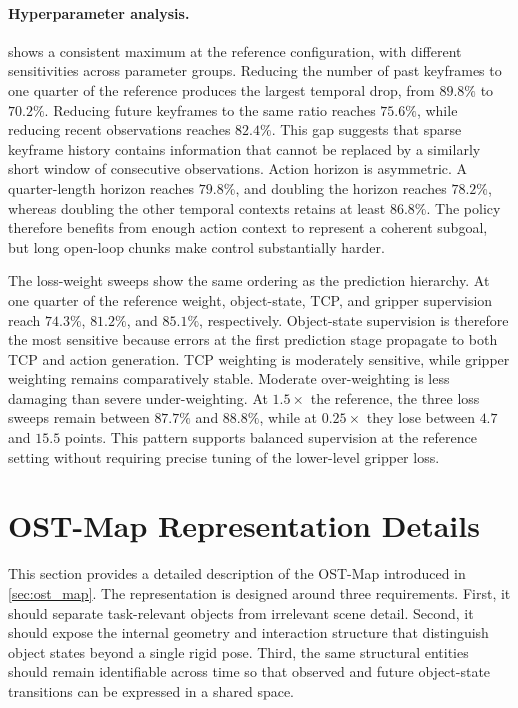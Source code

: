 \paragraph{Hyperparameter analysis.}
 shows a consistent maximum at the
reference configuration, with different sensitivities across parameter groups.
Reducing the number of past keyframes to one quarter of the reference produces
the largest temporal drop, from $89.8\%$ to $70.2\%$. Reducing future
keyframes to the same ratio reaches $75.6\%$, while reducing recent
observations reaches $82.4\%$. This gap suggests that sparse keyframe history
contains information that cannot be replaced by a similarly short window of
consecutive observations. Action horizon is asymmetric. A quarter-length
horizon reaches $79.8\%$, and doubling the horizon reaches $78.2\%$, whereas
doubling the other temporal contexts retains at least $86.8\%$. The policy
therefore benefits from enough action context to represent a coherent subgoal,
but long open-loop chunks make control substantially harder.

The loss-weight sweeps show the same ordering as the prediction hierarchy.
At one quarter of the reference weight, object-state, TCP, and gripper
supervision reach $74.3\%$, $81.2\%$, and $85.1\%$, respectively. Object-state
supervision is therefore the most sensitive because errors at the first
prediction stage propagate to both TCP and action generation. TCP weighting is
moderately sensitive, while gripper weighting remains comparatively stable.
Moderate over-weighting is less damaging than severe under-weighting. At
$1.5\times$ the reference, the three loss sweeps remain between $87.7\%$ and
$88.8\%$, while at $0.25\times$ they lose between $4.7$ and $15.5$ points.
This pattern supports balanced supervision at the reference setting without
requiring precise tuning of the lower-level gripper loss.

\section{OST-Map Representation Details}
\label{app:ost_map_representation}

This section provides a detailed description of the OST-Map introduced in
\cref{sec:ost_map}. The representation is designed around three requirements.
First, it should separate task-relevant objects from irrelevant scene detail.
Second, it should expose the internal geometry and interaction structure that
distinguish object states beyond a single rigid pose. Third, the same
structural entities should remain identifiable across time so that observed
and future object-state transitions can be expressed in a shared space.

